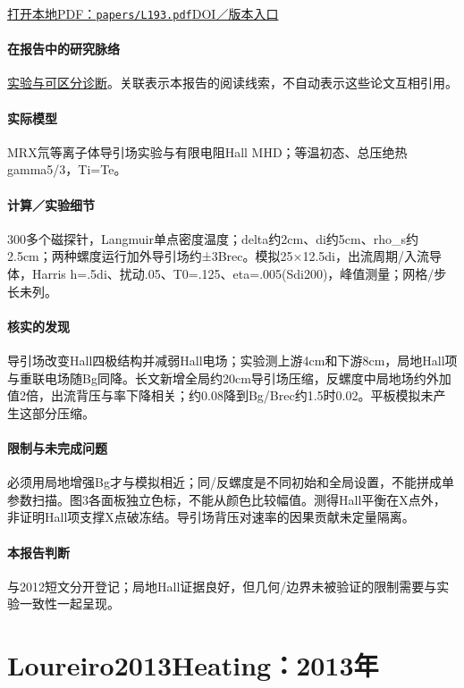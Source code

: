 \documentclass[UTF8,a4paper,11pt,openany,fontset=fandol]{ctexbook}
\begin{document}
\href{run:../papers/L193.pdf}{打开本地PDF：\texttt{papers/L193.pdf}}\quad\href{https://doi.org/10.1063/1.4805244}{DOI／版本入口}

\paragraph{在报告中的研究脉络}\hyperref[story:diagnostic]{实验与可区分诊断}。关联表示本报告的阅读线索，不自动表示这些论文互相引用。

\paragraph{实际模型}MRX氘等离子体导引场实验与有限电阻Hall MHD；等温初态、总压绝热gamma5/3，Ti=Te。

\paragraph{计算／实验细节}300多个磁探针，Langmuir单点密度温度；delta约2cm、di约5cm、rho\_s约2.5cm；两种螺度运行加外导引场约±3Brec。模拟25×12.5di，出流周期/入流导体，Harris h=.5di、扰动.05、T0=.125、eta=.005(Sdi200)，峰值测量；网格/步长未列。

\paragraph{核实的发现}导引场改变Hall四极结构并减弱Hall电场；实验测上游4cm和下游8cm，局地Hall项与重联电场随Bg同降。长文新增全局约20cm导引场压缩，反螺度中局地场约外加值2倍，出流背压与率下降相关；约0.08降到Bg/Brec约1.5时0.02。平板模拟未产生这部分压缩。

\paragraph{限制与未完成问题}必须用局地增强Bg才与模拟相近；同/反螺度是不同初始和全局设置，不能拼成单参数扫描。图3各面板独立色标，不能从颜色比较幅值。测得Hall平衡在X点外，非证明Hall项支撑X点破冻结。导引场背压对速率的因果贡献未定量隔离。

\paragraph{本报告判断}与2012短文分开登记；局地Hall证据良好，但几何/边界未被验证的限制需要与实验一致性一起呈现。

\section{Loureiro2013Heating：2013年}\label{paper:Loureiro2013Heating}
\end{document}
